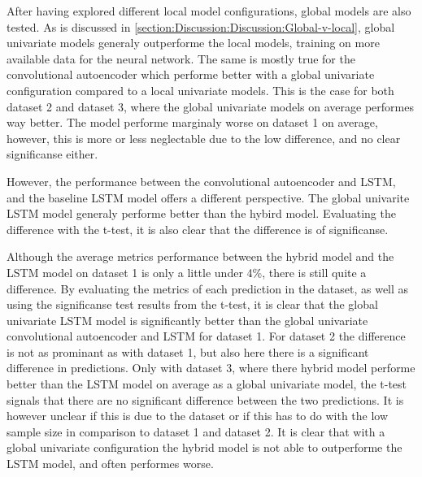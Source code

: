 After having explored different local model configurations,
global models are also tested.
As is discussed in \cref{section:Discussion:Discussion:Global-v-local},
global univariate models generaly outperforme the local models, training on more available data for the neural network.
The same is mostly true for the convolutional autoencoder which performe better with a global univariate configuration compared to a local univariate models.
This is the case for both dataset 2 and dataset 3, where the global univariate models on average performes way better.
The model performe marginaly worse on dataset 1 on average, however, this is more or less neglectable due to the low difference, and no clear significanse either.

However, the performance between the convolutional autoencoder and LSTM, and the baseline LSTM model offers a different perspective.
The global univarite LSTM model generaly performe better than the hybird model.
Evaluating the difference with the t-test, it is also clear that the difference is of significanse.

Although the average metrics performance between the hybrid model and the LSTM model on dataset 1 is only a little under 4\%,
there is still quite a difference.
By evaluating the metrics of each prediction in the dataset, as well as using the significanse test results from the t-test,
it is clear that the global univariate LSTM model is significantly better than the global univariate convolutional autoencoder and LSTM for dataset 1.
For dataset 2 the difference is not as prominant as with dataset 1, but also here there is a significant difference in predictions.
Only with dataset 3, where there hybrid model performe better than the LSTM model on average as a global univariate model,
the t-test signals that there are no significant difference between the two predictions.
It is however unclear if this is due to the dataset or if this has to do with the low sample size in comparison to dataset 1 and dataset 2.
It is clear that with a global univariate configuration the hybrid model is not able to outperforme the LSTM model,
and often performes worse.


